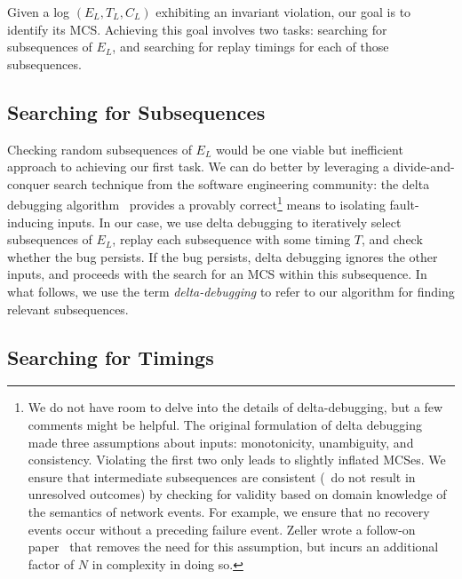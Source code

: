 Given a log $(E_L, T_L, C_L)$ exhibiting an invariant violation,
our goal is to identify its MCS. Achieving this goal involves two tasks:
searching for subsequences of $E_L$, and searching for replay timings for each of those
subsequences.

\subsection{Searching for Subsequences}
\label{subsec:delta_debugging}

Checking random subsequences of $E_L$ would be one viable but inefficient
approach to achieving our first task. We can do better by leveraging a
divide-and-conquer search technique from the software engineering community:
the delta
debugging algorithm~\cite{Zeller:1999:YMP:318773.318946} provides a provably
correct\footnote{We do not have room to delve into the details of delta-debugging, but a few comments might be helpful. The original formulation of delta debugging\cite{Zeller:1999:YMP:318773.318946}
made three
assumptions about inputs: monotonicity, unambiguity, and consistency.
Violating the first two only leads to slightly inflated MCSes. We ensure that
intermediate subsequences are consistent (\ie~do not result in unresolved
outcomes) by checking for validity based on domain knowledge of the semantics
of network events. For example, we ensure that no recovery events occur
without a preceding failure event. Zeller wrote a follow-on
paper~\cite{Zeller:2002:SIF:506201.506206} that removes the need for this assumption,
but incurs an additional factor of $N$ in complexity in doing so.}
means to isolating fault-inducing inputs. In our case, we use delta
debugging to iteratively select subsequences of $E_L$, replay each
subsequence with
some timing $T$, and check whether the bug persists. If the bug persists,
delta debugging ignores the
other inputs, and proceeds with the search for an MCS within this subsequence.
In what follows, we use the term {\em delta-debugging} to refer to our algorithm for finding relevant subsequences.

\subsection{Searching for Timings}
\label{subsec:algorithm}

